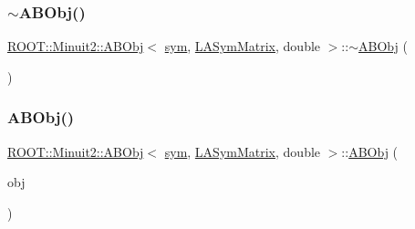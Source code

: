 \mbox{\label{classROOT_1_1Minuit2_1_1ABObj_3_01sym_00_01LASymMatrix_00_01double_01_4_a42b0b36ac55162609ddc385b3631cb6b}} 
\subsubsection{\texorpdfstring{$\sim$ABObj()}{~ABObj()}\hspace{0.1cm}{\footnotesize\ttfamily [2/3]}}
{\footnotesize\ttfamily \mbox{\hyperlink{classROOT_1_1Minuit2_1_1ABObj}{R\+O\+O\+T\+::\+Minuit2\+::\+A\+B\+Obj}}$<$ \mbox{\hyperlink{classROOT_1_1Minuit2_1_1sym}{sym}}, \mbox{\hyperlink{classROOT_1_1Minuit2_1_1LASymMatrix}{L\+A\+Sym\+Matrix}}, double $>$\+::$\sim$\mbox{\hyperlink{classROOT_1_1Minuit2_1_1ABObj}{A\+B\+Obj}} (\begin{DoxyParamCaption}{ }\end{DoxyParamCaption})\hspace{0.3cm}{\ttfamily [inline]}}

\mbox{\label{classROOT_1_1Minuit2_1_1ABObj_3_01sym_00_01LASymMatrix_00_01double_01_4_ad172181f07e897f45d1fe0d7954bb03b}} 
\subsubsection{\texorpdfstring{ABObj()}{ABObj()}\hspace{0.1cm}{\footnotesize\ttfamily [7/12]}}
{\footnotesize\ttfamily \mbox{\hyperlink{classROOT_1_1Minuit2_1_1ABObj}{R\+O\+O\+T\+::\+Minuit2\+::\+A\+B\+Obj}}$<$ \mbox{\hyperlink{classROOT_1_1Minuit2_1_1sym}{sym}}, \mbox{\hyperlink{classROOT_1_1Minuit2_1_1LASymMatrix}{L\+A\+Sym\+Matrix}}, double $>$\+::\mbox{\hyperlink{classROOT_1_1Minuit2_1_1ABObj}{A\+B\+Obj}} (\begin{DoxyParamCaption}\item[{const \mbox{\hyperlink{classROOT_1_1Minuit2_1_1ABObj}{A\+B\+Obj}}$<$ \mbox{\hyperlink{classROOT_1_1Minuit2_1_1sym}{sym}}, \mbox{\hyperlink{classROOT_1_1Minuit2_1_1LASymMatrix}{L\+A\+Sym\+Matrix}}, double $>$ \&}]{obj }\end{DoxyParamCaption})\hspace{0.3cm}{\ttfamily [inline]}}

